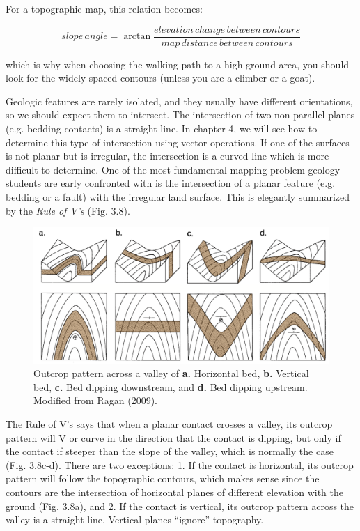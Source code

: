 \documentclass[a4paper , 12pt]{book}
\begin{document}
For a topographic map, this relation becomes:

\begin{equation}
    slope\,angle = \arctan\frac{elevation\,change\,between\,contours}{map\,distance\,between\,contours} \tag{3.5b}
\end{equation}

which is why when choosing the walking path to a high ground area, you should look for the widely spaced contours (unless you are a climber or a goat).

Geologic features are rarely isolated, and they usually have different orientations, so we should expect them to intersect. The intersection of two non-parallel planes (e.g. bedding contacts) is a straight line. In chapter 4, we will see how to determine this type of intersection using vector operations. If one of the surfaces is not planar but is irregular, the intersection is a curved line which is more difficult to determine. One of the most fundamental mapping problem geology students are early confronted with is the intersection of a planar feature (e.g. bedding or a fault) with the irregular land surface. This is elegantly summarized by the \textit{Rule of V’s} (Fig. 3.8).

\begin{figure}[ht]
    \centering
    \includegraphics[width=13cm]{Figures/ch3f8.png}
    \caption{Outcrop pattern across a valley of \textbf{a.} Horizontal bed, \textbf{b.} Vertical bed, \textbf{c.} Bed dipping downstream, and \textbf{d.} Bed dipping upstream. Modified from Ragan (2009).}
\end{figure}

The Rule of V’s says that when a planar contact crosses a valley, its outcrop pattern will V or curve in the direction that the contact is dipping, but only if the contact if steeper than the slope of the valley, which is normally the case (Fig. 3.8c-d). There are two exceptions: 1. If the contact is horizontal, its outcrop pattern will follow the topographic contours, which makes sense since the contours are the intersection of horizontal planes of different elevation with the ground (Fig. 3.8a), and 2. If the contact is vertical, its outcrop pattern across the valley is a straight line. Vertical planes “ignore” topography.
\end{document}

